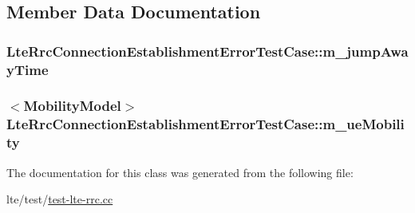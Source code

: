 \subsection{Member Data Documentation}
\subsubsection[{\texorpdfstring{m\+\_\+jump\+Away\+Time}{m_jumpAwayTime}}]{ Lte\+Rrc\+Connection\+Establishment\+Error\+Test\+Case\+::m\+\_\+jump\+Away\+Time\hspace{0.3cm}{\ttfamily [private]}}\hypertarget{classLteRrcConnectionEstablishmentErrorTestCase_a87b0c65728967bca3f13de445b04b911}{}\label{classLteRrcConnectionEstablishmentErrorTestCase_a87b0c65728967bca3f13de445b04b911}
\subsubsection[{\texorpdfstring{m\+\_\+ue\+Mobility}{m_ueMobility}}]{$<${\bf Mobility\+Model}$>$ Lte\+Rrc\+Connection\+Establishment\+Error\+Test\+Case\+::m\+\_\+ue\+Mobility\hspace{0.3cm}{\ttfamily [private]}}\hypertarget{classLteRrcConnectionEstablishmentErrorTestCase_ae4cadd3c64d09eec2a511495dcc89095}{}\label{classLteRrcConnectionEstablishmentErrorTestCase_ae4cadd3c64d09eec2a511495dcc89095}


The documentation for this class was generated from the following file\+:\begin{DoxyCompactItemize}
\item 
lte/test/\hyperlink{test-lte-rrc_8cc}{test-\/lte-\/rrc.\+cc}\end{DoxyCompactItemize}
